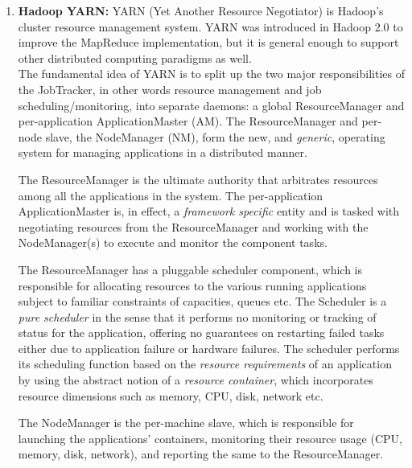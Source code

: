 \documentclass[a4paper,12pt,oneside]{report}
\begin{document}
\begin{enumerate}
        \item \textbf{Hadoop YARN:}
                YARN (Yet Another Resource Negotiator) is Hadoop’s cluster resource management
                system. YARN was introduced in Hadoop 2.0 to improve the MapReduce implementation,
                but it is general enough to support other distributed computing paradigms
                as well.\\

                The fundamental idea of YARN is to split up the two major responsibilities of the JobTracker,
                in other words resource management and job scheduling/monitoring, into separate daemons: a
                global ResourceManager and per-application ApplicationMaster (AM). The ResourceManager
                and per-node slave, the NodeManager (NM), form the new, and \textit{generic}, operating system for
                managing applications in a distributed manner. 

                The ResourceManager is the ultimate authority that arbitrates resources among all the
                applications in the system. The per-application ApplicationMaster is, in effect, a \textit{framework
                specific} entity and is tasked with negotiating resources from the ResourceManager and working
                with the NodeManager(s) to execute and monitor the component tasks.

                The ResourceManager has a pluggable scheduler component, which is responsible for
                allocating resources to the various running applications subject to familiar constraints of
                capacities, queues etc. The Scheduler is a \textit{pure scheduler} in the sense that it performs no
                monitoring or tracking of status for the application, offering no guarantees on restarting failed
                tasks either due to application failure or hardware failures. The scheduler performs its
                scheduling function based on the \textit{resource requirements} of an application by using the abstract
                notion of a \textit{resource container}, which incorporates resource dimensions such as memory, CPU,
                disk, network etc. 

                The NodeManager is the per-machine slave, which is responsible for launching the
                applications’ containers, monitoring their resource usage (CPU, memory, disk, network), and
                reporting the same to the ResourceManager. 


\end{enumerate}
\end{document}
